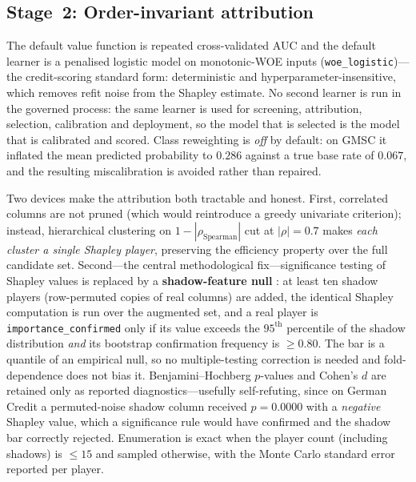 \documentclass[9pt,journal]{IEEEtai}
\begin{document}
\subsection{Stage~2: Order-invariant attribution}
The default value function is repeated cross-validated AUC and the default learner is a
penalised logistic model on monotonic-WOE inputs (\texttt{woe\_logistic})---the credit-scoring
standard form: deterministic and hyperparameter-insensitive, which removes refit noise from
the Shapley estimate. No second learner is run in the governed process: the same learner is used for screening,
attribution, selection, calibration and deployment, so the model that is selected is the model that is calibrated and
scored. Class reweighting is \emph{off} by default: on GMSC it inflated the mean predicted probability
to $0.286$ against a true base rate of $0.067$, and the resulting miscalibration is avoided
rather than repaired.

Two devices make the attribution both tractable and honest. First, correlated columns are not
pruned (which would reintroduce a greedy univariate criterion); instead, hierarchical
clustering on $1-|\rho_{\text{Spearman}}|$ cut at $|\rho|=0.7$ makes \emph{each cluster a single
Shapley player}, preserving the efficiency property over the full candidate set. Second---the
central methodological fix---significance testing of Shapley values is replaced by a
\textbf{shadow-feature null} \cite{kursa2010boruta}: at least ten shadow players (row-permuted
copies of real columns) are added, the identical Shapley computation is run over the augmented
set, and a real player is \texttt{importance\_confirmed} only if its value exceeds the
$95^{\text{th}}$ percentile of the shadow distribution \emph{and} its bootstrap confirmation
frequency is $\ge0.80$. The bar is a quantile of an empirical null, so no multiple-testing
correction is needed and fold-dependence does not bias it. Benjamini--Hochberg \cite{bh1995} $p$-values and
Cohen's $d$ \cite{cohen1988} are retained only as reported diagnostics---usefully self-refuting, since on German
Credit a permuted-noise shadow column received $p=0.0000$ with a \emph{negative} Shapley value,
which a significance rule would have confirmed and the shadow bar correctly rejected.
Enumeration is exact when the player count (including shadows) is $\le15$ and sampled otherwise,
with the Monte Carlo standard error reported per player.
\end{document}
